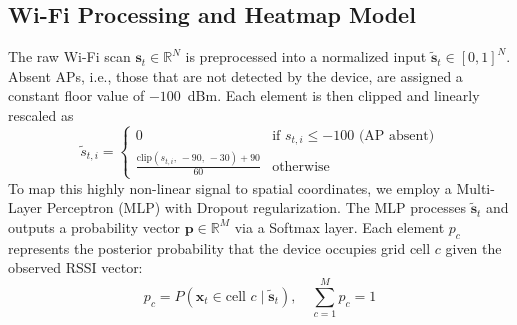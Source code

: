\documentclass[conference]{IEEEtran}
\begin{document}
\subsection{Wi-Fi Processing and Heatmap Model}

The raw Wi-Fi scan $\mathbf{s}_t \in \mathbb{R}^N$ is preprocessed into a normalized input $\tilde{\mathbf{s}}_t \in [0,1]^N$. Absent APs, i.e., those that are not detected by the device, are assigned a constant floor value of $-100$~dBm. Each element is then clipped and linearly rescaled as
\begin{equation}
\tilde{s}_{t,i} = \begin{cases} 0 & \text{if } s_{t,i} \leq -100 \text{ (AP absent)} \\ \frac{\text{clip}(s_{t,i},\, -90,\, -30) + 90}{60} & \text{otherwise} \end{cases} \label{eq:wifi_norm}
\end{equation}
To map this highly non-linear signal to spatial coordinates, we employ a Multi-Layer Perceptron (MLP) with Dropout regularization. The MLP processes $\tilde{\mathbf{s}}_t$ and outputs a probability vector $\mathbf{p} \in \mathbb{R}^M$ via a Softmax layer. Each element $p_c$ represents the posterior probability that the device occupies grid cell $c$ given the observed RSSI vector:
\begin{equation}
p_c = P(\mathbf{x}_t \in \text{cell } c \mid \tilde{\mathbf{s}}_t), \quad \sum_{c=1}^{M} p_c = 1 \label{eq:softmax_def}
\end{equation}
\end{document}
